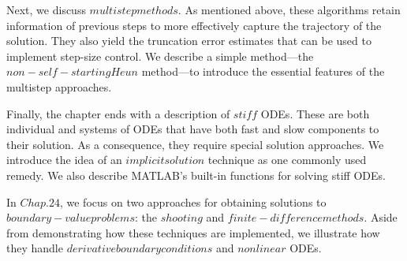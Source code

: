 \documentclass[../main.tex]{subfiles}
\begin{document}
Next, we discuss $multistep methods$. As mentioned above, these algorithms retain information of previous steps to more effectively capture the trajectory of the solution. They
also yield the truncation error estimates that can be used to implement step-size control. We
describe a simple method—the $non-self-starting Heun$ method—to introduce the essential
features of the multistep approaches.

Finally, the chapter ends with a description of $stiff$ ODEs. These are both individual
and systems of ODEs that have both fast and slow components to their solution. As a consequence, they require special solution approaches. We introduce the idea of an $implicit
solution$ technique as one commonly used remedy. We also describe MATLAB's built-in
functions for solving stiff ODEs.

In $Chap. 24$, we focus on two approaches for obtaining solutions to $boundary-value
problems$: the $shooting$ and $finite-difference methods$. Aside from demonstrating how these
techniques are implemented, we illustrate how they handle $derivative boundary conditions$
and $nonlinear$ ODEs.















	
	
	
	
\end{document}

